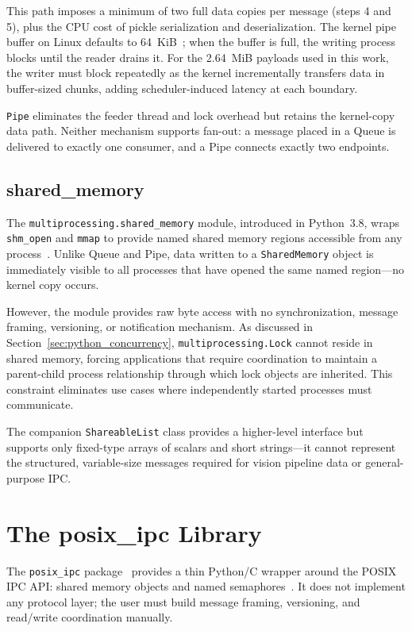 This path imposes a minimum of two full data copies per message (steps 4 and 5), plus the CPU cost of pickle serialization and deserialization. The kernel pipe buffer on Linux defaults to 64~KiB~\cite{kerrisk2010}; when the buffer is full, the writing process blocks until the reader drains it. For the 2.64~MiB payloads used in this work, the writer must block repeatedly as the kernel incrementally transfers data in buffer-sized chunks, adding scheduler-induced latency at each boundary.

\texttt{Pipe} eliminates the feeder thread and lock overhead but retains the kernel-copy data path. Neither mechanism supports fan-out: a message placed in a Queue is delivered to exactly one consumer, and a Pipe connects exactly two endpoints.

\subsection{shared\_memory}
\label{subsec:mp_shm}

The \texttt{multiprocessing.shared\_memory} module, introduced in Python~3.8, wraps \texttt{shm\_open} and \texttt{mmap} to provide named shared memory regions accessible from any process~\cite{python_multiprocessing}. Unlike Queue and Pipe, data written to a \texttt{SharedMemory} object is immediately visible to all processes that have opened the same named region---no kernel copy occurs.

However, the module provides raw byte access with no synchronization, message framing, versioning, or notification mechanism. As discussed in Section~\ref{sec:python_concurrency}, \texttt{multiprocessing.Lock} cannot reside in shared memory, forcing applications that require coordination to maintain a parent-child process relationship through which lock objects are inherited. This constraint eliminates use cases where independently started processes must communicate.

The companion \texttt{ShareableList} class provides a higher-level interface but supports only fixed-type arrays of scalars and short strings---it cannot represent the structured, variable-size messages required for vision pipeline data or general-purpose IPC.


\section{The posix\_ipc Library}
\label{sec:posix_ipc}

The \texttt{posix\_ipc} package~\cite{posixipc_pkg} provides a thin Python/C wrapper around the POSIX IPC API: shared memory objects and named semaphores~\cite{posix2017}. It does not implement any protocol layer; the user must build message framing, versioning, and read/write coordination manually.


